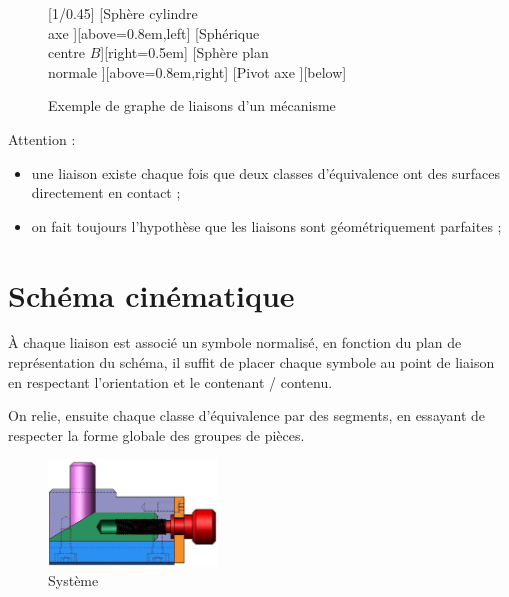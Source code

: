 \documentclass[10pt,fleqn]{article} %
\begin{document}
\begin{figure}[!ht]
\centering
\begin{grapheLiaisons}[scale=0.45]
[1/0.45]
[Sphère cylindre\\ axe ][above=0.8em,left]
[Sphérique\\ centre $B$][right=0.5em]
[Sphère plan\\ normale ][above=0.8em,right]
[Pivot axe ][below]
\end{grapheLiaisons}
\caption{Exemple de graphe de liaisons d'un mécanisme}
\label{graphe_liaisons_ex}
\end{figure}

\begin{warn} Attention :
  \begin{itemize}
  \item une liaison existe chaque fois que deux classes d'équivalence ont des surfaces directement en contact ;
  \item on fait toujours l'hypothèse que les liaisons sont géométriquement parfaites ;
  \end{itemize}
\end{warn}

\section{Schéma cinématique}

À chaque liaison est associé un symbole normalisé, en fonction du plan de représentation du schéma, il suffit de placer chaque symbole au point de liaison en respectant l'orientation et le contenant / contenu.

On relie, ensuite chaque classe d'équivalence par des segments, en essayant de respecter la forme globale des groupes de pièces.

\begin{figure}[h]
  \centering
  \includegraphics[width=0.4\textwidth]{images/equivalence}
  \caption{Système}
  \label{}
\end{figure}
\end{document}
